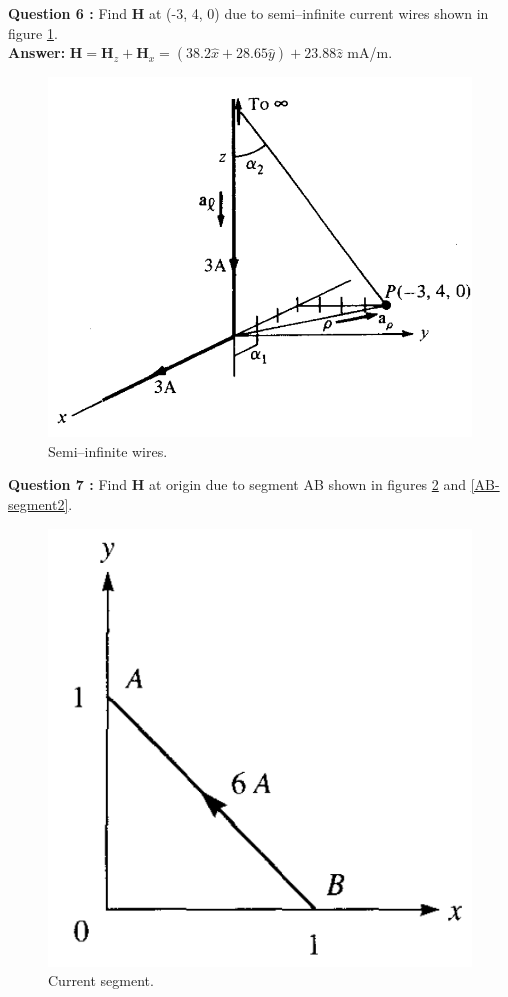 \documentclass[12pt,a4paper]{article}
\begin{document}
\newpage
\noindent\textbf{Question 6 \cite[Example 7.1, page 266]{Sadiku}:} Find \textbf{H} at (-3, 4, 0) due to semi--infinite current wires shown in figure \ref{Semi-infinite-wires}.\\
\textbf{Answer: }$\textbf{H}=\textbf{H}_z+\textbf{H}_x=(38.2\hat x+28.65\hat y)+23.88\hat z$ mA/m.
\begin{figure}[H]
\centering
\includegraphics[scale=0.45]{Figure7-7aS.png}
\caption{Semi--infinite wires.}
\label{Semi-infinite-wires}
\end{figure}
\noindent\textbf{Question 7 \cite[Problem 7.3 and 7.4, page 297]{Sadiku}:} Find \textbf{H} at origin due to segment AB shown in figures \ref{AB-segment1} and \ref{AB-segment2}.\\
\begin{figure}[H]
\centering
\includegraphics[scale=0.45]{Figure7-26S.png}
\caption{Current segment.}
\label{AB-segment1}
\end{figure}
\end{document}
